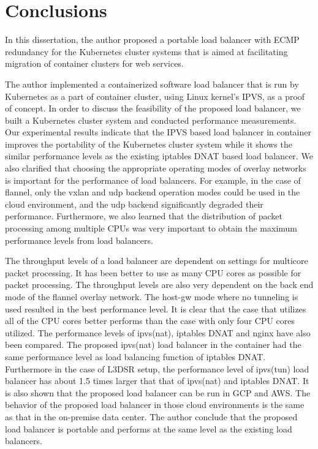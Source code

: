 \section{Conclusions}\label{Conclusions}

In this dissertation, the author proposed a portable load balancer with ECMP redundancy for the Kubernetes cluster systems that is aimed at facilitating migration of container clusters for web services.

The author implemented a containerized software load balancer that is run by Kubernetes as a part of container cluster, using Linux kernel's IPVS, as a proof of concept.
In order to discuss the feasibility of the proposed load balancer, we built 
a Kubernetes cluster system and conducted performance measurements.
Our experimental results indicate that the IPVS based load balancer in container improves the portability of 
the Kubernetes cluster system while it shows the similar performance levels as the existing iptables DNAT based load balancer.
We also clarified that choosing the appropriate operating modes of overlay networks is important for the performance of load balancers. 
For example, in the case of flannel, only the vxlan and udp backend operation modes could be used 
in the cloud environment, and the udp backend significantly degraded their performance.
Furthermore, we also learned that the distribution of packet processing among multiple CPUs was very important
to obtain the maximum performance levels from load balancers.

The throughput levels of a load balancer are dependent on settings for multicore packet processing.
It has been better to use as many CPU cores as possible for packet processing.
The throughput levels are also very dependent on the back end mode of the flannel overlay network.
The host-gw mode where no tunneling is used resulted in the best performance level.
It is clear that the case that utilizes all of the CPU cores better performs than the case with only four CPU cores utilized.
The performance levels of ipvs(nat), iptables DNAT and nginx have also been compared.
The proposed ipvs(nat) load balancer in the container had the same performance level as load balancing function of iptables DNAT.
Furthermore in the case of L3DSR setup, the performance level of ipvs(tun) load balancer has about 1.5 times larger that that of ipvs(nat) and iptables DNAT.
It is also shown that the proposed load balancer can be run in GCP and AWS.
The behavior of the proposed load balancer in those cloud environments is the same as that in the on-premise data center.
The author conclude that the proposed load balancer is portable and performs at the same level as the existing load balancers.


